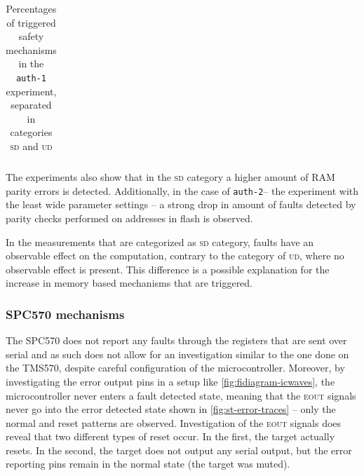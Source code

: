\documentclass[10pt]{article}
\newcommand{\TI}{TMS570\xspace}
\newcommand{\ST}{SPC570\xspace}
\newcommand{\authone}{\texttt{auth-1}\xspace}
\newcommand{\authtwo}{\texttt{auth-2}\xspace}
\newcommand{\UD}{\textsc{ud}\xspace}
\newcommand{\SD}{\textsc{sd}\xspace}
\newcommand{\errorpin}{\textsc{eout}\xspace}
\begin{document}
\begin{table}[H]
\begin{tabular}{lr|rr}
          \bottomrule
          \end{tabular}
        \caption{Percentages of triggered safety mechanisms in the \authone experiment, separated in categories \SD and \UD}
        \label{tab:tms570-fault-overview-auth-ud-sd}
        \end{table}

        The experiments also show that in the \SD category a higher amount of RAM parity errors is detected. Additionally, in the case of \authtwo -- the experiment with the least wide parameter settings -- a strong drop in amount of faults detected by parity checks performed on addresses in flash is observed. 

        In the measurements that are categorized as \SD category, faults have an observable effect on the computation, contrary to the category of \UD, where no observable effect is present. This difference is a possible explanation for the increase in memory based mechanisms that are triggered.

    \subsubsection{\ST mechanisms }%
        The \ST does not report any faults through the registers that are sent over serial and as such does not allow for an investigation similar to the one done on the \TI, despite careful configuration of the microcontroller. Moreover, by investigating the error output pins in a setup like \autoref{fig:fidiagram-icwaves}, the microcontroller never enters a fault detected state, meaning that the \errorpin signals never go into the error detected state shown in \autoref{fig:st-error-traces} -- only the normal and reset patterns are observed. Investigation of the \errorpin signals does reveal that two different types of reset occur. In the first, the target actually resets. In the second, the target does not output any serial output, but the error reporting pins remain in the normal state (the target was muted).
\end{document}
